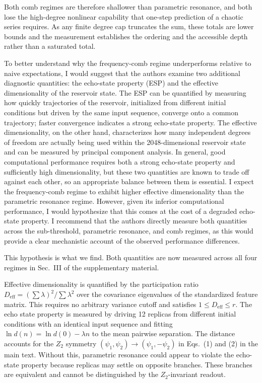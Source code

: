 \documentclass{ar2rc}
\begin{document}
Both comb regimes are therefore shallower than parametric resonance, and both lose the high-degree nonlinear capability that one-step prediction of a chaotic series requires. As any finite degree cap truncates the sum, these totals are lower bounds and the measurement establishes the ordering and the accessible depth rather than a saturated total.

\RC \label{rev:1.2}To better understand why the frequency-comb regime underperforms relative to naive expectations, I would suggest that the authors examine two additional diagnostic quantities: the echo-state property (ESP) and the effective dimensionality of the reservoir state. The ESP can be quantified by measuring how quickly trajectories of the reservoir, initialized from different initial conditions but driven by the same input sequence, converge onto a common trajectory; faster convergence indicates a strong echo-state property. The effective dimensionality, on the other hand, characterizes how many independent degrees of freedom are actually being used within the 2048-dimensional reservoir state and can be measured by principal component analysis. In general, good computational performance requires both a strong echo-state property and sufficiently high dimensionality, but these two quantities are known to trade off against each other, so an appropriate balance between them is essential. I expect the frequency-comb regime to exhibit higher effective dimensionality than the parametric resonance regime. However, given its inferior computational performance, I would hypothesize that this comes at the cost of a degraded echo-state property. I recommend that the authors directly measure both quantities across the sub-threshold, parametric resonance, and comb regimes, as this would provide a clear mechanistic account of the observed performance differences.

\AR This hypothesis is what we find. Both quantities are now measured across all four regimes in Sec.~III of the supplementary material.

Effective dimensionality is quantified by the participation ratio $D_{\text{eff}} = \left( \sum \lambda \right)^2 / \sum \lambda^2$ over the covariance eigenvalues of the standardized feature matrix. This requires no arbitrary variance cutoff and satisfies $1\le D_{\text{eff}} \le r$. The echo state property is measured by driving 12 replicas from different initial conditions with an identical input sequence and fitting $\ln d(n) = \ln d(0) - \lambda n$ to the mean pairwise separation. The distance accounts for the $Z_2$ symmetry $(\psi_1,\psi_2)\rightarrow(\psi_1,-\psi_2)$ in Eqs.~(1) and (2) in the main text. Without this, parametric resonance could appear to violate the echo-state property because replicas may settle on opposite branches. These branches are equivalent and cannot be distinguished by the $Z_2$-invariant readout.
\end{document}
